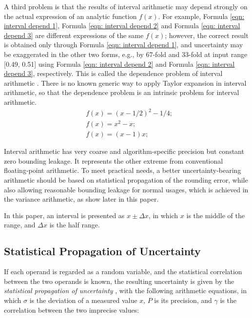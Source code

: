 \documentclass[twoside]{article}
\numberwithin{equation}{section}
\begin{document}
A third problem is that the results of interval arithmetic may depend strongly on the actual expression of an analytic function $f(x)$.  
For example, Formula \eqref{eqn: interval depend 1}, Formula \eqref{eqn: interval depend 2} and Formula \eqref{eqn: interval depend 3} are different expressions of the same $f(x)$; however, the correct result is obtained only through Formula \eqref{eqn: interval depend 1}, and uncertainty may be exaggerated in the other two forms, e.g., by 67-fold and 33-fold at input range [0.49, 0.51] using Formula \eqref{eqn: interval depend 2} and Formula \eqref{eqn: interval depend 3}, respectively.  
This is called the dependence problem of interval arithmetic \cite{Interval_Arithmetic}.  
There is no known generic way to apply Taylor expansion in interval arithmetic, so that the dependence problem is an intrinsic problem for interval arithmetic.
\begin{align}
\label{eqn: interval depend 1} & 
f(x) = (x - 1/2)^{2} - 1/4; \\
\label{eqn: interval depend 2} & 
f(x) = x^{2} - x; \\
\label{eqn: interval depend 3} & 
f(x) = (x - 1) x;
\end{align}

Interval arithmetic has very coarse and algorithm-specific precision but constant zero bounding leakage.  
It represents the other extreme from conventional floating-point arithmetic.  
To meet practical needs, a better uncertainty-bearing arithmetic should be based on statistical propagation of the rounding error, while also allowing reasonable bounding leakage for normal usages, which is achieved in the variance arithmetic, as show later in this paper.

In this paper, an interval is presented as $x \pm \Delta x$, in which $x$ is the middle of the range, and $\Delta x$ is the half range.


\subsection{Statistical Propagation of Uncertainty}

If each operand is regarded as a random variable, and the statistical correlation between the two operands is known, the resulting uncertainty is given by the \emph{statistical propagation of uncertainty} \cite{Statistical_Arithmetic}\cite{Statistical_Analysis}, with the following arithmetic equations, in which $\sigma$ is the deviation of a measured value $x$, $P$ is its precision, and $\gamma$ is the correlation between the two imprecise values:
\end{document}
